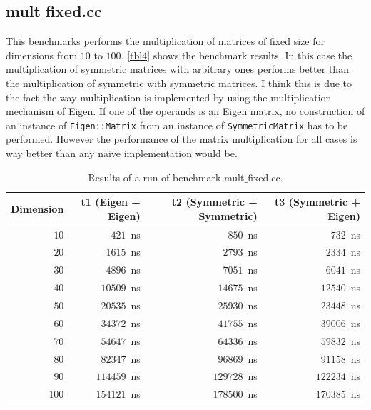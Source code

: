 \documentclass[a4wide]{scrartcl}
\begin{document}
\subsection{mult$\_$fixed.cc}
This benchmarks performs the multiplication of matrices of fixed size for dimensions from $10$ to $100$. \autoref{tbl4} shows the benchmark results. In this case the multiplication of symmetric matrices with arbitrary ones performs better than the multiplication of symmetric with symmetric matrices. I think this is due to the fact the way multiplication is implemented by using the multiplication mechanism of Eigen. If one of the operands is an Eigen matrix, no construction of an instance of \texttt{Eigen::Matrix} from an instance of \texttt{SymmetricMatrix} has to be performed.\newline
However the performance of the matrix multiplication for all cases is way better than any naive implementation would be.
\begin{table}
    \centering
\begin{tabular}{r|r|r|r}
    Dimension & t1 (Eigen + Eigen)  & t2 (Symmetric + Symmetric) & t3 (Symmetric + Eigen)  \\ \hline \hline
    $10$  & $421$~ns & $850$~ns & $732$~ns\\
    $20$  & $1615$~ns & $2793$~ns & $2334$~ns\\
    $30$  & $4896$~ns & $7051$~ns & $6041$~ns\\
    $40$  & $10509$~ns & $14675$~ns & $12540$~ns\\
    $50$  & $20535$~ns & $25930$~ns & $23448$~ns\\
    $60$  & $34372$~ns & $41755$~ns & $39006$~ns\\
    $70$  & $54647$~ns & $64336$~ns & $59832$~ns \\
    $80$  & $82347$~ns & $96869$~ns & $91158$~ns \\
    $90$  & $114459$~ns & $129728$~ns & $122234$~ns\\
    $100$ & $154121$~ns & $178500$~ns & $170385$~ns
    \end{tabular}
    \caption{Results of a run of benchmark mult$\_$fixed.cc.}
    \label{tbl4}
\end{table}
\end{document}
